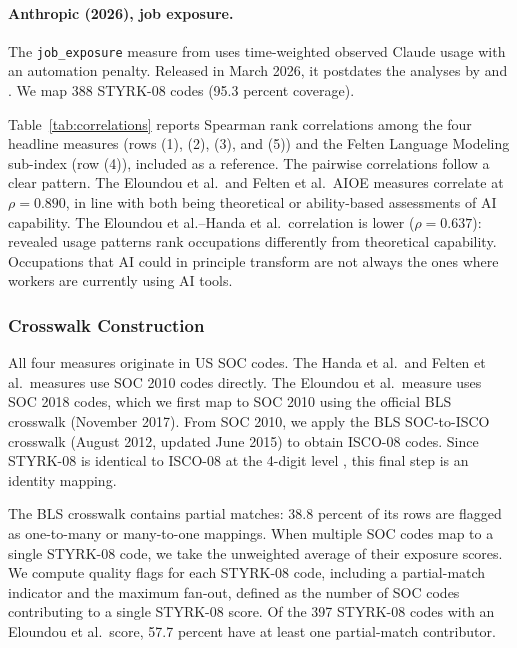 \paragraph{Anthropic (2026), job exposure.} The \texttt{job\_exposure} measure from \citet{anthropic2026} uses time-weighted observed Claude usage with an automation penalty. Released in March 2026, it postdates the analyses by \citet{brynjolfsson2025} and \citet{kauhanen2026}. We map 388 STYRK-08 codes (95.3 percent coverage).

\medskip

Table~\ref{tab:correlations} reports Spearman rank correlations among the four headline measures (rows (1), (2), (3), and (5)) and the Felten Language Modeling sub-index (row (4)), included as a reference. The pairwise correlations follow a clear pattern. The Eloundou et al.\ and Felten et al.\ AIOE measures correlate at $\rho = 0.890$, in line with both being theoretical or ability-based assessments of AI capability. The Eloundou et al.--Handa et al.\ correlation is lower ($\rho = 0.637$): revealed usage patterns rank occupations differently from theoretical capability. Occupations that AI could in principle transform are not always the ones where workers are currently using AI tools.

\subsubsection*{Crosswalk Construction}

All four measures originate in US SOC codes. The Handa et al.\ and Felten et al.\ measures use SOC 2010 codes directly. The Eloundou et al.\ measure uses SOC 2018 codes, which we first map to SOC 2010 using the official BLS crosswalk (November 2017). From SOC 2010, we apply the BLS SOC-to-ISCO crosswalk (August 2012, updated June 2015) to obtain ISCO-08 codes. Since STYRK-08 is identical to ISCO-08 at the 4-digit level \citep{ssb2011styrk}, this final step is an identity mapping.

The BLS crosswalk contains partial matches: 38.8 percent of its rows are flagged as one-to-many or many-to-one mappings. When multiple SOC codes map to a single STYRK-08 code, we take the unweighted average of their exposure scores. We compute quality flags for each STYRK-08 code, including a partial-match indicator and the maximum fan-out, defined as the number of SOC codes contributing to a single STYRK-08 score. Of the 397 STYRK-08 codes with an Eloundou et al.\ score, 57.7 percent have at least one partial-match contributor.


